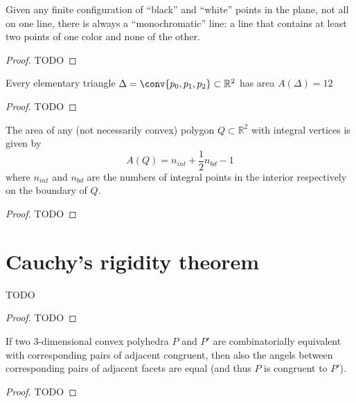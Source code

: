 \begin{theorem}
  \label{monochromatic_lines}
  Given any finite configuration of ``black'' and ``white'' points
  in the plane, not all on one line, there is always a ``monochromatic'' line:
  a line that contains at least two points of one color and none of the other.
\end{theorem}
\begin{proof}
  TODO
\end{proof}

\begin{lemma}
  \label{pick_lemma}
  Every elementary triangle \(\Delta = \conv\{p_0, p_1, p_2\}\subset \mathbb{R}^2\) has area
  \(A(\Delta)=12\)
\end{lemma}
\begin{proof}
  TODO
\end{proof}


\begin{theorem}
  \label{pick_theorem}
  The area of any (not necessarily convex) polygon \(Q\subset\mathbb{R}^2\) with
  integral vertices is given by
  \[
  A(Q) = n_{int} + \frac{1}{2}n_{bd} - 1
  \]
  where \(n_{int}\) and \(n_{bd}\) are the numbers of integral points in the interior
  respectively on the boundary of \(Q\).
\end{theorem}
\begin{proof}
  TODO
\end{proof}


\chapter{Cauchy's rigidity theorem}


\begin{lemma}
  \label{arm_lemma}
  TODO
\end{lemma}
\begin{proof}
  TODO
\end{proof}

\begin{theorem}
  \label{cauchy_rigidity}
  If two \(3\)-dimensional convex polyhedra \(P\) and \(P'\) are
  combinatorially equivalent with corresponding pairs of adjacent congruent,
  then also the angels between corresponding pairs of adjacent
  facets are equal (and thus \(P\) is congruent to \(P'\)).
\end{theorem}
\begin{proof}
  TODO
\end{proof}


